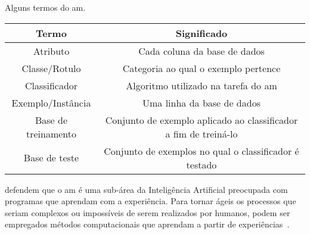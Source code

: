     
    
    \begin{quadro}
        \centering
        \caption{Alguns termos do \ac{am}.}
        \begin{tabular} {c|c} \hline
            \label{quad:machine-learning-terms}
            \textbf{Termo} & \textbf{Significado} \\ \hline
            Atributo & Cada coluna da base de dados \\ \hline
            Classe/Rotulo & Categoria ao qual o exemplo pertence \\ \hline
            Classificador & Algoritmo utilizado na tarefa do \ac{am} \\ \hline
            Exemplo/Instância & Uma linha da base de dados \\ \hline
            Base de treinamento & Conjunto de exemplo aplicado ao classificador a fim de treiná-lo \\ \hline
            Base de teste & Conjunto de exemplos no qual o classificador é testado \\ \hline
        \end{tabular}
    \end{quadro}
    
     defendem que o \ac{am} é uma sub\hyp{área} da Inteligência Artificial preocupada com programas que aprendam com a experiência. Para tornar ágeis os processos que seriam complexos ou impossíveis de serem realizados por humanos, podem ser empregados métodos computacionais que aprendam a partir de experiências~\cite{mitchell1997machine, mohri2012foundations}.
        
    
    
